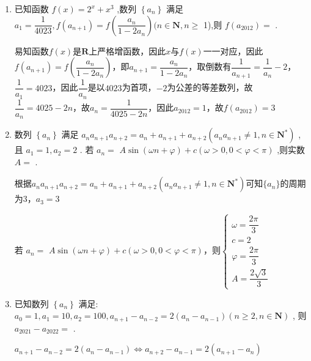 \begin{enumerate}
\begin{jieda}
        因此$\dfrac{{b}_{2021}}{{a}_{1008}} = \dfrac{2022 \times 2^{2019}}{1011 \times 2^{1006}} = 2^{1014}$
    \end{jieda}
    \item 已知函数 $f\left( x\right)  = {2}^{x} + {x}^{3}$ ,数列 $\left\{  {a}_{n}\right\}$ 满足 ${a}_{1} = \dfrac{1}{4023},f\left( {a}_{n + 1}\right)  = f\left( \dfrac{{a}_{n}}{1 - 2{a}_{n}}\right) (n \in  \mathbf{N},n \geq$ 1),则 $f\left( {a}_{2012}\right)  =$ .
    \begin{jieda}
        易知函数$f(x)$是$\mathbf{R}$上严格增函数，因此$x$与$f(x)$一一对应，因此$f\left( {a}_{n + 1}\right)  = f\left( \dfrac{{a}_{n}}{1 - 2{a}_{n}}\right)$，即${a}_{n + 1}  = \dfrac{{a}_{n}}{1 - 2{a}_{n}}$，取倒数有$\dfrac{1}{a_{n+1}} = \dfrac{1}{a_n} - 2$，$\dfrac{1}{a_1} = 4023$，因此$\dfrac{1}{a_n}$是以$4023$为首项，$-2$为公差的等差数列，故$\dfrac{1}{a_n} = 4025-2n$，故$a_n = \dfrac{1}{4025-2n}$，因此$a_{2012} = 1$，故$f(a_{2012}) = 3$
    \end{jieda}
    \item 数列 $\left\{  {a}_{n}\right\}$ 满足 ${a}_{n}{a}_{n + 1}{a}_{n + 2} = {a}_{n} + {a}_{n + 1} + {a}_{n + 2}\left( {{a}_{n}{a}_{n + 1} \neq  1,n \in  {\mathbf{N}}^{ * }}\right)$ ,且 ${a}_{1} = 1,{a}_{2} = 2$ . 若 ${a}_{n} =$  $A\sin \left( {{\omega n} + \varphi }\right)  + c\left( {\omega  > 0,0 < \varphi  < \pi }\right)$ ,则实数 $A =$ .
    \begin{jieda}
        根据${a}_{n}{a}_{n + 1}{a}_{n + 2} = {a}_{n} + {a}_{n + 1} + {a}_{n + 2}\left( {{a}_{n}{a}_{n + 1} \neq  1,n \in  {\mathbf{N}}^{ * }}\right)$可知$\{a_n\}$的周期为3，$a_3 = 3$

        若 ${a}_{n} =$  $A\sin \left( {{\omega n} + \varphi }\right)  + c\left( {\omega  > 0,0 < \varphi  < \pi }\right)$，则$\left\{\begin{array}{l}
             \omega = \dfrac{2\pi}{3} \\
             c = 2 \\
             \varphi = \dfrac{2\pi}{3} \\
             A = \dfrac{2\sqrt{3}}{3}
        \end{array}\right.$
    \end{jieda}
    \item 已知数列 $\left\{  {a}_{n}\right\}$ 满足: ${a}_{0} = 1,{a}_{1} = {10},{a}_{2} = {100},{a}_{n + 1} - {a}_{n - 2} = 2\left( {{a}_{n} - {a}_{n - 1}}\right) \left( {n \geq  2,n \in  \mathbf{N}}\right)$ , 则 ${a}_{2021} - {a}_{2022} =$ .
    \begin{jieda}
        ${a}_{n + 1} - {a}_{n - 2} = 2\left( {{a}_{n} - {a}_{n - 1}}\right) \Longleftrightarrow {a}_{n + 2} - {a}_{n - 1} = 2\left( {{a}_{n+1} - {a}_{n}}\right)$


\end{jieda}
\end{enumerate}
